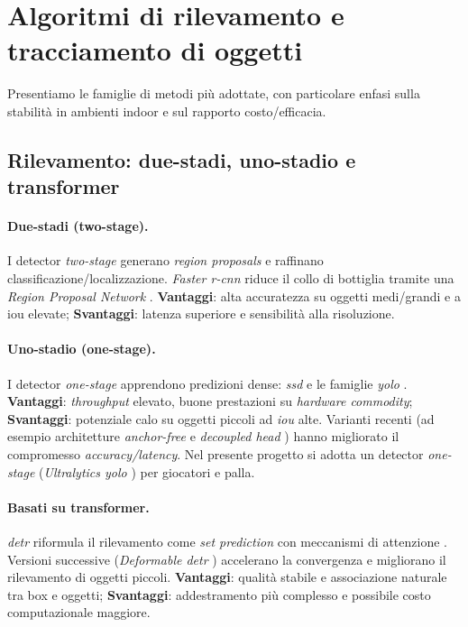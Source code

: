 \documentclass[12pt,a4paper,openright,twoside]{book}
\begin{document}
\section{Algoritmi di rilevamento e tracciamento di oggetti}
\label{sec:algoritmi-rilevamento-tracciamento}
Presentiamo le famiglie di metodi più adottate, con particolare 
enfasi sulla stabilità in ambienti indoor e sul rapporto costo/efficacia.

\subsection{Rilevamento: due-stadi, uno-stadio e transformer}

\paragraph{Due-stadi (two-stage).} I detector \emph{two-stage} 
generano \emph{region proposals} e raffinano classificazione/localizzazione.
\emph{Faster \ac{r-cnn}} riduce il collo di bottiglia tramite una 
\emph{Region Proposal Network} \cite{Ren2015FasterRCNN}.
\textbf{Vantaggi}: alta accuratezza su oggetti medi/grandi e a \ac{iou} elevate; 
\textbf{Svantaggi}: latenza superiore e sensibilità alla risoluzione.

\paragraph{Uno-stadio (one-stage).} I detector \emph{one-stage} 
apprendono predizioni dense: \emph{\ac{ssd}} \cite{Liu2016SSD} e le famiglie
\emph{\ac{yolo}} \cite{Redmon2018YOLOv3}. \textbf{Vantaggi}: 
\emph{throughput} elevato, buone prestazioni su \emph{hardware commodity}; 
\textbf{Svantaggi}: potenziale calo su oggetti piccoli ad \emph{iou} alte. 
Varianti recenti (ad esempio architetture \emph{anchor-free} 
\cite{Ultralytics2025AnchorFree} e \emph{decoupled head} 
\cite{Meng2023YOLOv5sFog}) hanno migliorato il compromesso 
\emph{accuracy/latency}. Nel presente progetto si adotta un detector 
\emph{one-stage} (\emph{Ultralytics \ac{yolo}} 
\cite{Ge2021YOLOX}) per giocatori e palla. 

\paragraph{Basati su transformer.} \emph{\ac{detr}} riformula 
il rilevamento come \emph{set prediction} con meccanismi di 
attenzione \cite{Ye2022OSTrack}. Versioni successive 
(\emph{Deformable \ac{detr}} \cite{Zhu2020DeformableDETR}) accelerano
la convergenza e migliorano il rilevamento di oggetti piccoli. 
\textbf{Vantaggi}: qualità stabile e associazione naturale tra box e oggetti; 
\textbf{Svantaggi}: addestramento più complesso e possibile costo computazionale maggiore.
\end{document}
